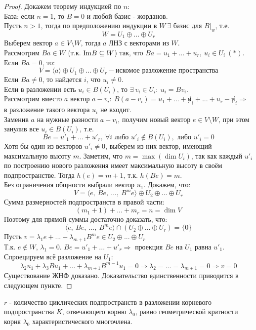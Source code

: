 \begin{proof}
        Докажем теорему индукцией по $n$:\\
        База: если $n=1$, то $B = 0$ и любой базис - жорданов.\\
        Пусть $n>1$, тогда по предположению индукции в $W \ \exists$ базис для $B|_w$, т.е.
        $$W = U_1 \oplus ... \oplus U_r$$
        Выберем вектор $a \in V\setminus W$, тогда $a$ ЛНЗ с векторами из $W$.\\
        Рассмотрим $Ba \in W$ (т.к. $\textup{Im}B \subseteq W$) так, что $Ba = u_1 + ... + u_r, \ u_i \in U_i \ (*)$. \\
        Если $Ba = 0$, то:
        $$V = \langle a \rangle \oplus U_1 \oplus ... \oplus U_r - \text{искомое разложение пространства}$$
        Если $Ba \neq 0$, то найдется $i$, что $u_i \neq 0$.\\
        Если в разложении есть $u_i \in B(U_i)$, то  $\exists \ v_i \in U_i: \ u_i = Bv_i$.\\
        Рассмотрим вместо $a$ вектор $a-v_i: \ B(a-v_i) = u_1 + ... + \not u_i+...+u_r - \not u_i \Longrightarrow $ в разложение такого вектора $u_i$ не входит.\\
        Заменив $a$ на нужные разности $a-v_i$, получим новый вектор $e \in V\setminus W$, при этом занулив все $u_i \in B(U_i)$, т.е.
        $$Be = u'_1 + ... + u'_r, \ \forall i \text{ либо } u'_i \not \in B(U_i), \text{ либо } u'_i = 0$$
        Хотя бы один из векторов $u'_i \neq 0$, выберем из них вектор, имеющий максимальную высоту $m$. Заметим, что $m=\max (\dim U_i)$, так как каждый $u'_i$ по построению нового разложения имеет максимальную высоту в своём подпространстве. Тогда $h(e) = m+1$, т.к. $h(Be) = m$. \\
        Без ограничения общности выбрали вектор $u_1$. Докажем, что:
        $$V = \langle e, \ Be, \ ..., \ B^me \rangle \oplus U_2 \oplus ... \oplus U_r$$
        Сумма размерностей подпространств в правой части: 
        $$(m_1+1)+...+m_r = n = \dim V$$
        Поэтому для прямой суммы достаточно доказать, что: 
        $$\langle e, \ Be, \ ..., \ B^me \rangle \cap (U_2 \oplus ... \oplus U_r) = \{0\}$$
        Пусть $v = \lambda_1 e +...+ \lambda_{m+1}B^me \in U_2 \oplus ... \oplus U_r$ \\
        Т.к. $e \not \in W$, $\lambda_1 = 0$. $Be = u'_1+...+u'_r \Rightarrow$ проекция $Be$ на $U_1$ равна $u'_1$.\\
        Спроецируем всё разложение на $U_1$: 
        $$\lambda_2u_1+\lambda_3Bu_1+...+\lambda_{m+1}B^{m-1}u_1 = 0 \Longrightarrow \lambda_2=...=\lambda_{m+1} = 0 \Longrightarrow v = 0$$   
        Существование ЖНФ доказано. Доказательство единственности приводится в следующем пункте.   
    \end{proof}
    \begin{remark}
        $r$ - количество циклических подпространств в разложении корневого подпространства $K$, отвечающего корню $\lambda_0$, равно геометрической кратности корня $\lambda_0$ характеристического многочлена.    
    \end{remark}


